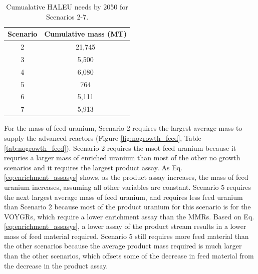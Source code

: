 \begin{table}
    \centering 
    \caption{Cumualative HALEU needs by 2050 for Scenarios 2-7.}
    \label{tab:nogrowth_haleu}
    \begin{tabular}{c c}
        \hline 
        Scenario & Cumulative mass (MT) \\
        \hline
        2 & 21,745\\
        3 & 5,500 \\
        4 & 6,080 \\
        5 & 764 \\
        6 & 5,111 \\
        7 & 5,913 \\
        \hline        
    \end{tabular}
\end{table}

For the mass of feed uranium, Scenario 2 requires the largest average mass 
to supply the advanced reactors (Figure \ref{fig:nogrowth_feed}, Table 
\ref{tab:nogrowth_feed}). Scenario 2 requires the msot feed uranium 
because it requries a larger mass of enriched uranium than most 
of the other no growth scenarios and it requires the largest product 
assay. As Eq. \ref{eq:enrichment_assasys} shows, as the product assay 
increases, the mass of feed uranium increases, assuming all other 
variables are constant. Scenario 5 requires the next largest average 
mass of feed uranium, and requires less feed uranium than Scenario 2 
because 
most of the product uranium for this scenario is for the VOYGRs, which 
require a lower enrichment assay than the \glspl{MMR}. Based on Eq. 
\ref{eq:enrichment_assasys}, a lower assay of the product stream results in 
a lower mass of feed material required. Scenario 5 still requires more feed 
material than the other scenarios because the average product mass required 
is much larger than the other scenarios, which offsets some of the decrease 
in feed material from the decrease in the product assay. 


